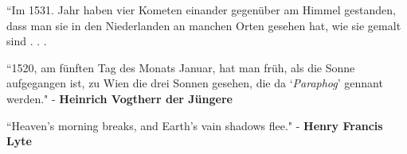 \documentclass[11pt]{article}
\begin{document}
\begingroup
\begin{center}
``Im 1531. Jahr haben vier Kometen einander gegenüber am Himmel gestanden, dass man sie in den Niederlanden an manchen Orten gesehen hat, wie sie gemalt sind . . . 
\rightskip\leftskip
\phantom{text} \hfill \textcolor{white}{fuck}
\end{center}
\endgroup

\begingroup
\begin{center}
``1520, am fünften Tag des Monats Januar, hat man früh, als die Sonne aufgegangen ist, zu Wien die drei Sonnen gesehen, die da `\textit{Paraphog}' gennant werden."
\rightskip\leftskip
\phantom{text} \hfill - \textbf{Heinrich Vogtherr der Jüngere}
\end{center}
\endgroup

\vspace*{0.1\baselineskip}

\begingroup
\begin{center}
``Heaven's morning breaks, and Earth's vain shadows flee."
\rightskip\leftskip
\phantom{text} \hfill - \textbf{Henry Francis Lyte}
\end{center}
\endgroup
\end{document}
